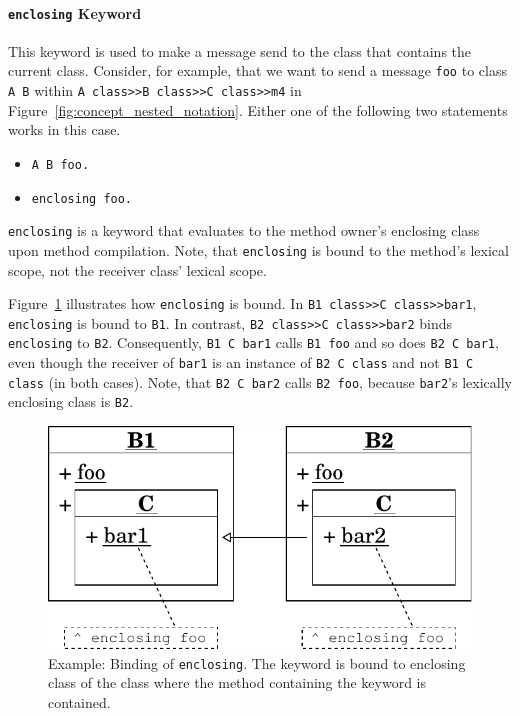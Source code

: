 \paragraph{\texttt{enclosing} Keyword}
This keyword is used to make a message send to the class that contains the current class. Consider, for example, that we want to send a message \texttt{foo} to class \texttt{A B} within \texttt{A class>>B class>>C class>>m4} in Figure~\ref{fig:concept_nested_notation}. Either one of the following two statements works in this case.

\begin{itemize}
	\item \texttt{A B foo.}
	\item \texttt{enclosing foo.}
\end{itemize}

\texttt{enclosing} is a keyword that evaluates to the method owner's enclosing class upon method compilation. Note, that \texttt{enclosing} is bound to the method's lexical scope, not the receiver class' lexical scope.

Figure~\ref{fig:concept_lexical_thisouter} illustrates how \texttt{enclosing} is bound. In \texttt{B1 class>>C class>>bar1}, \texttt{enclosing} is bound to \texttt{B1}. In contrast, \texttt{B2 class>>C class>>bar2} binds \texttt{enclosing} to \texttt{B2}. Consequently, \texttt{B1 C bar1} calls \texttt{B1 foo} and so does \texttt{B2 C bar1}, even though the receiver of \texttt{bar1} is an instance of \texttt{B2 C class} and not \texttt{B1 C class} (in both cases). Note, that \texttt{B2 C bar2} calls \texttt{B2 foo}, because \texttt{bar2}'s lexically enclosing class is \texttt{B2}.

\begin{figure}[!htp]
	\includegraphics[scale=0.75]{nested_lexical1.pdf}
	\centering
	\caption[Example: Binding of \texttt{enclosing}]{Example: Binding of \texttt{enclosing}. The keyword is bound to enclosing class of the class where the method containing the keyword is contained.}
	\label{fig:concept_lexical_thisouter}
\end{figure}


